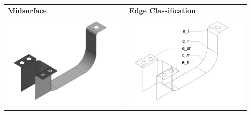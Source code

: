 \begin{tabular}[htp]{@{}p{0.48\linewidth} p{0.48\linewidth}@{}} 
{\bf Midsurface} & {\bf Edge Classification} \\
\includegraphics[width=\linewidth]{../Common/images/SimpleBracketMidsurfshaded.pdf} &
\includegraphics[width=\linewidth]{../Common/images/SimpleBracketMidsurf.pdf}\\
\end{tabular}


